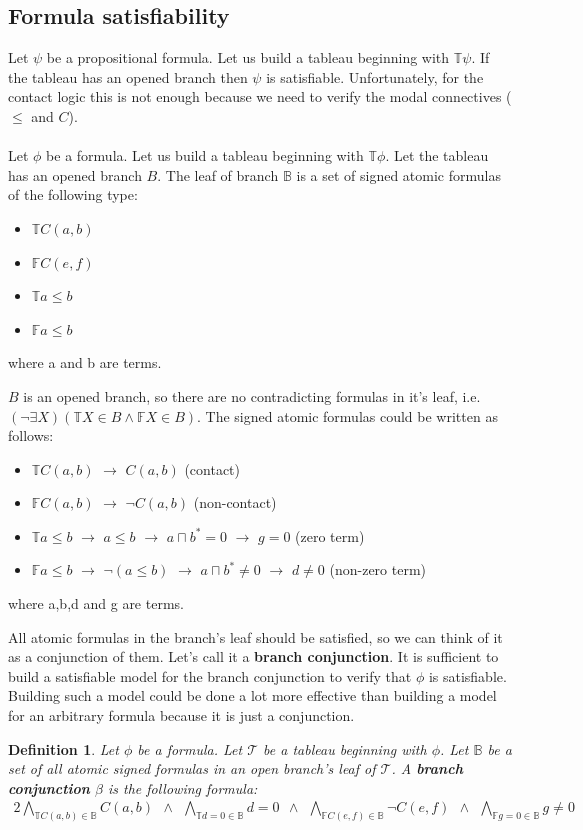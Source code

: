 \documentclass{article}
\newcommand\ST{\mathbb{T}}
\newcommand\SF{\mathbb{F}}
\newcommand\SB{\mathbb{B}}
\newtheorem{defn}[theorem]{Definition}
\newcommand{\BranchConjunction}{%
\begin{alignat}{2}
			\bigwedge_{\ST C(a,b)\in{\SB}} C(a, b) \:\: \wedge \:\:
			\bigwedge_{\ST d = 0\in{\SB}} d = 0 \:\: \wedge \:\:
			\bigwedge_{\SF C(e,f)\in{\SB}} \neg C(e, f) \:\: \wedge \:\:
			\bigwedge_{\SF g = 0\in{\SB}} g \neq 0
\end{alignat}%
}
\begin{document}
	\subsection{Formula satisfiability}
		Let $\psi$ be a propositional formula. Let us build a tableau beginning with $\ST \psi$. If the tableau has an opened branch then $\psi$ is satisfiable. Unfortunately, for the contact logic this is not enough because we need to verify the modal connectives ($\leq$ and $C$).
		\paragraph{}
		Let $\phi$ be a formula. Let us build a tableau beginning with $\ST \phi$. Let the tableau has an opened branch $B$. The leaf of branch $\SB$ is a set of signed atomic formulas of the following type:
		\begin{itemize}
			\item $\ST C(a,b)$
			\item $\SF C(e,f)$
			\item $\ST a \leq b$
			\item $\SF a \leq b$
		\end{itemize}
		where a and b are terms.

		\noindent $B$ is an opened branch, so there are no contradicting formulas in it's leaf, i.e. $(\neg \exists X)(\ST X \in B \land \SF X \in B)$.
		The signed atomic formulas could be written as follows:
		\begin{itemize}
			\item $\ST C(a,b)$ $\rightarrow$ $C(a,b)$ (contact)
			\item $\SF C(a,b)$ $\rightarrow$ $\neg C(a,b)$ (non-contact)
			\item $\ST a \leq b$ $\rightarrow$ $a \leq b$ $\rightarrow$ $a \sqcap b^*=0$ $\rightarrow$ $g = 0$ (zero term)
			\item $\SF a \leq b$ $\rightarrow$ $\neg (a \leq b)$ $\rightarrow$ $a \sqcap b^* \neq 0$ $\rightarrow$ $d \neq 0$ (non-zero term)
		\end{itemize}
			\noindent where a,b,d and g are terms.

		All atomic formulas in the branch's leaf should be satisfied, so we can think of it as a conjunction of them. Let's call it a \textbf{branch conjunction}. It is sufficient to build a satisfiable model for the branch conjunction to verify that $\phi$ is satisfiable. Building  such a model could be done a lot more effective than building a model for an arbitrary formula because it is just a conjunction.
		\begin{defn}
			\label{branch-conjunction}
			Let $\phi$ be a formula. Let $\mathcal{T}$ be a tableau beginning with $\phi$. Let $\SB$ be a set of all atomic signed formulas in an open branch's leaf of $\mathcal{T}$. A \textbf{branch conjunction} $\beta$ is the following formula:
		 \BranchConjunction
		\end{defn}
\end{document}
